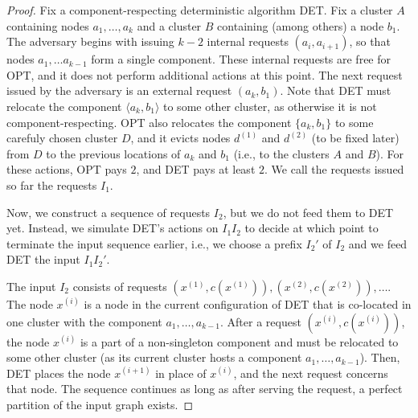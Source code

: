 \begin{proof}


 
 
  Fix a component-respecting deterministic algorithm DET.
  Fix a cluster $A$ containing nodes $a_1, \ldots, a_k$ and a cluster $B$ containing (among others) a node $b_1$.
  The adversary begins with issuing $k-2$ internal requests $(a_i, a_{i+1})$, so that nodes $a_1, \ldots a_{k-1}$ form a single component.
  These internal requests are free for OPT, and it does not perform additional actions at this point.
  The next request issued by the adversary is an external request $(a_k, b_1)$. %
  Note that DET must relocate the component $\langle a_k, b_1\rangle$ to some other cluster, as otherwise it is not component-respecting.
  OPT also relocates the component $\{ a_k, b_1\}$ to some carefuly chosen cluster $D$, and it evicts nodes $d^{(1)}$ and $d^{(2)}$ (to be fixed later) from $D$ to the previous locations of $a_k$ and $b_1$ (i.e., to the clusters $A$ and $B$).
  For these actions, OPT pays $2$, and DET pays at least $2$.
  We call the requests issued so far the requests $I_1$.


  Now, we construct a sequence of requests $I_2$, but we do not feed them to DET yet.
  Instead, we simulate DET's actions on $I_1I_2$ to decide at which point to terminate the input sequence earlier, i.e., we choose a prefix $I_2'$ of $I_2$ and we feed DET the input $I_1I_2'$.


  The input $I_2$ consists of requests $(x^{(1)}, c(x^{(1)})), (x^{(2)}, c(x^{(2)})),\ldots$.
  The node $x^{(i)}$ is a node in the current configuration of DET that is co-located in one cluster with the component $a_1, \ldots, a_{k-1}$.
  After a request $(x^{(i)}, c(x^{(i)}))$, the node $x^{(i)}$ is a part of a non-singleton component and must be relocated to some other cluster (as its current cluster hosts a component $a_1, \ldots, a_{k-1}$).
  Then, DET places the node $x^{(i+1)}$ in place of $x^{(i)}$, and the next request concerns that node.
  The sequence continues as long as after serving the request, a perfect partition of the input graph exists.


\end{proof}
